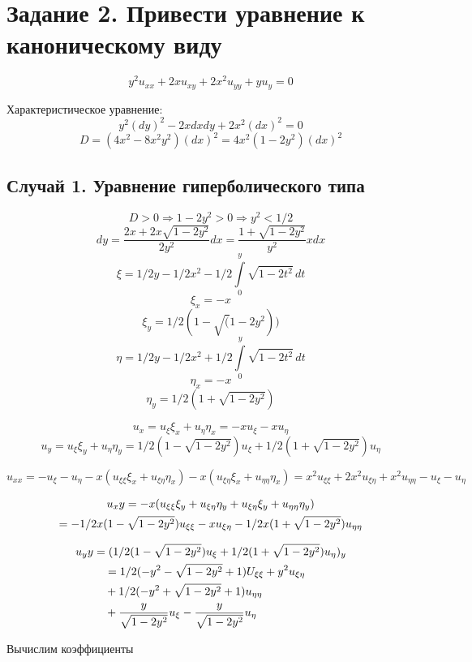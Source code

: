 \documentclass[a4paper,12pt]{article}
\begin{document}
\section{Задание 2. Привести уравнение к каноническому виду}
$$y^2u_{xx}+2xu_{xy} + 2x^2u_{yy} + yu_y = 0$$

Характеристическое уравнение:
$$y^2(dy)^2 - 2xdxdy + 2x^2(dx)^2 = 0$$
$$D = (4x^2 - 8x^2y^2)(dx)^2 = 4x^2(1 - 2y^2)(dx)^2$$

\subsection{Случай 1. Уравнение гиперболического типа} 

$$D > 0 \Rightarrow 1 - 2y^2 > 0 \Rightarrow y^2 < 1/2$$
$$dy = \frac{2x + 2x\sqrt{1-2y^2}}{2y^2}dx = \frac{1+\sqrt{1-2y^2}}{y^2}xdx$$
$$\xi = 1/2y - 1/2x^2 - 1/2 \int\limits_{0}^{y} \sqrt{1-2t^2} \,dt$$
$$\xi_x = -x$$ 
$$\xi_y = 1/2(1 - \sqrt(1-2y^2))$$
$$\eta = 1/2y - 1/2x^2 + 1/2 \int\limits_{0}^{y} \sqrt{1-2t^2} \,dt$$
$$\eta_x = -x$$ 
$$\eta_y = 1/2(1 + \sqrt{1-2y^2})$$

$$u_x = u_{\xi}\xi_x + u_{\eta}\eta_x = -xu_{\xi} - xu_{\eta}$$
$$u_y = u_{\xi}\xi_y + u_{\eta}\eta_y = 1/2(1 - \sqrt{1-2y^2})u_{\xi} + 1/2(1 + \sqrt{1-2y^2})u_{\eta}$$

$$u_{xx} = -u_\xi - u_\eta - x(u_{\xi\xi}\xi_x + u_{\xi\eta}\eta_x)
- x(u_{\xi\eta}\xi_x + u_{\eta\eta}\eta_x) = 
x^2u_{\xi\xi} + 2x^2u_{\xi\eta} + x^2u_{\eta\eta} - u_\xi - u_\eta$$

\begin{multline}
u_xy = -x(u_{\xi\xi}\xi_y + u_{\xi\eta}\eta_y + u_{\xi\eta}\xi_y + u_{\eta\eta}\eta_y) \notag \\
= -1/2x(1 - \sqrt{1-2y^2})u_{\xi\xi} - xu_{\xi\eta} - 1/2x(1 + \sqrt{1-2y^2})u_{\eta\eta}
\end{multline}

\begin{align}
    u_yy &= (1/2(1 - \sqrt{1-2y^2})u_\xi + 1/2(1 + \sqrt{1-2y^2})u_\eta)_y \notag \\
    &\quad = 1/2(-y^2 - \sqrt{1-2y^2} + 1)U_{\xi\xi} + y^2u_{\xi\eta} \notag \\ 
    & \quad + 1/2(-y^2 + \sqrt{1-2y^2} + 1)u_{\eta\eta} \notag \\
    &\quad + \frac{y}{\sqrt{1-2y^2}}u_\xi - \frac{y}{\sqrt{1-2y^2}}u_\eta \notag
\end{align}

Вычислим коэффициенты
\end{document}
